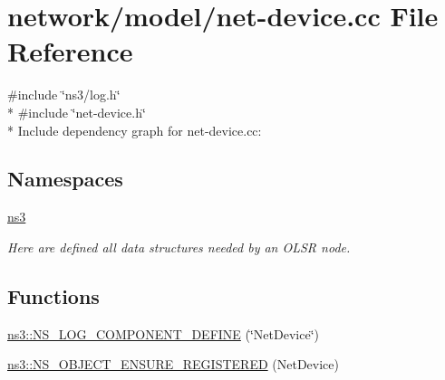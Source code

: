 \hypertarget{net-device_8cc}{}\section{network/model/net-\/device.cc File Reference}
\label{net-device_8cc}
{\ttfamily \#include \char`\"{}ns3/log.\+h\char`\"{}}\\*
{\ttfamily \#include \char`\"{}net-\/device.\+h\char`\"{}}\\*
Include dependency graph for net-\/device.cc\+:
\subsection*{Namespaces}
\begin{DoxyCompactItemize}
\item 
 \hyperlink{namespacens3}{ns3}
\begin{DoxyCompactList}\small\item\em Here are defined all data structures needed by an O\+L\+SR node. \end{DoxyCompactList}\end{DoxyCompactItemize}
\subsection*{Functions}
\begin{DoxyCompactItemize}
\item 
\hyperlink{namespacens3_aea1a41e36a76d15871bac9cd47b718f1}{ns3\+::\+N\+S\+\_\+\+L\+O\+G\+\_\+\+C\+O\+M\+P\+O\+N\+E\+N\+T\+\_\+\+D\+E\+F\+I\+NE} (\char`\"{}Net\+Device\char`\"{})
\item 
\hyperlink{namespacens3_a8b703d6f51e13b758926de5b0a07bb8d}{ns3\+::\+N\+S\+\_\+\+O\+B\+J\+E\+C\+T\+\_\+\+E\+N\+S\+U\+R\+E\+\_\+\+R\+E\+G\+I\+S\+T\+E\+R\+ED} (Net\+Device)
\end{DoxyCompactItemize}

